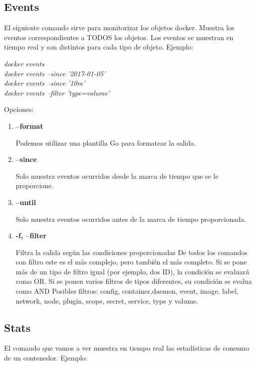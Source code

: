 \documentclass[]{article}
\begin{document}
\subsection{Events}

El siguiente comando sirve para monitorizar los objetos docker.
Muestra los eventos correspondientes a TODOS los objetos.
Los eventos se muestran en tiempo real y son distintos para cada tipo de objeto.
Ejemplo:

\begin{center}
	\it
	docker events\\
	docker events --since '2017-01-05'\\
	docker events --since '10m'\\
	docker events --filter 'type=volume'\\
\end{center}
Opciones:

\begin{enumerate}
	\renewcommand{\labelenumi}{$ \bullet $}	
	\item {\bf --format}
	
	Podemos utilizar una plantilla Go para formatear la salida.

	\item \textbf{ --since}
	
	Solo muestra eventos ocurridos desde la marca de tiempo que se le proporcione.

	\item {\bf --until}
	
	Solo muestra eventos ocurridos antes de la marca de tiempo proporcionada.

	\item {\bf -f, --filter}
	
	Filtra la salida según las condiciones proporcionadas
	De todos los comandos con filtro este es el más complejo, pero también el más completo.
	Si se pone más de un tipo de filtro igual (por ejemplo, dos ID), la condición se evaluará como OR.
	Si se ponen varios filtros de tipos diferentes, su condición se evalua como AND
	Posibles filtros:
	config, container,daemon, event, image, label, network, node, plugin, scope, secret, service, type y volume.

\end{enumerate}

\subsection{Stats}

El comando que vamos a ver muestra en tiempo real las estadísticas de consumo de un contenedor.
Ejemplo:
\end{document}
